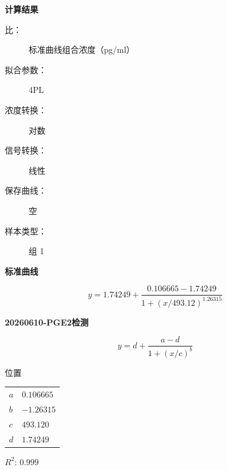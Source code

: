 \documentclass[UTF8,10pt,a4paper,fontset=fandol]{ctexart}
\begin{document}

\smallskip

\textbf{计算结果}

\begin{description}
    \item[比：]标准曲线组合浓度（pg/ml）
    \item[拟合参数：]4PL
    \item[浓度转换：]对数
    \item[信号转换：]线性
    \item[保存曲线：]空
    \item[样本类型：]组 1
\end{description}

\begin{center}
\textbf{标准曲线}

\end{center}

\[
y=1.74249+
\frac{0.106665-1.74249}
{1+\left(x/493.12\right)^{1.26315}}
\]

\newpage

\noindent\textbf{20260610-PGE2检测}\hfill{}

\[
y=d+\frac{a-d}{1+(x/c)^b}
\]

\noindent
位置

\begin{tabular}{@{}ll@{}}
$a$ & $0.106665$\\
$b$ & $-1.26315$\\
$c$ & $493.120$\\
$d$ & $1.74249$
\end{tabular}

\medskip

\noindent
$R^2$: $0.999$

\medskip
\end{document}
